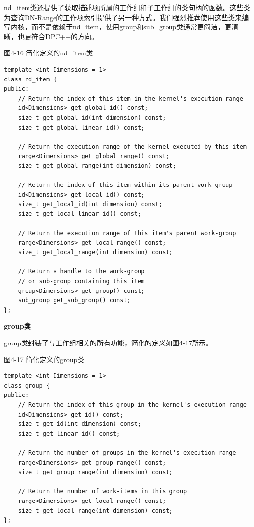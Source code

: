 nd\_item类还提供了获取描述项所属的工作组和子工作组的类句柄的函数。这些类为查询DN-Range的工作项索引提供了另一种方式。我们强烈推荐使用这些类来编写内核，而不是依赖于nd\_item，使用group和sub\_group类通常更简洁，更清晰，也更符合DPC++的方向。\par

\hspace*{\fill} \par %
图4-16 简化定义的nd\_item类
\begin{lstlisting}[caption={}]
template <int Dimensions = 1>
class nd_item {
public:
	// Return the index of this item in the kernel's execution range
	id<Dimensions> get_global_id() const;
	size_t get_global_id(int dimension) const;
	size_t get_global_linear_id() const;
	
	// Return the execution range of the kernel executed by this item
	range<Dimensions> get_global_range() const;
	size_t get_global_range(int dimension) const;
	
	// Return the index of this item within its parent work-group
	id<Dimensions> get_local_id() const;
	size_t get_local_id(int dimension) const;
	size_t get_local_linear_id() const;
	
	// Return the execution range of this item's parent work-group
	range<Dimensions> get_local_range() const;
	size_t get_local_range(int dimension) const;
	
	// Return a handle to the work-group
	// or sub-group containing this item
	group<Dimensions> get_group() const;
	sub_group get_sub_group() const;
};
\end{lstlisting}

\hspace*{\fill} \par %
\textbf{group类}

group类封装了与工作组相关的所有功能，简化的定义如图4-17所示。\par

\hspace*{\fill} \par %
图4-17 简化定义的group类
\begin{lstlisting}[caption={}]
template <int Dimensions = 1>
class group {
public:
	// Return the index of this group in the kernel's execution range
	id<Dimensions> get_id() const;
	size_t get_id(int dimension) const;
	size_t get_linear_id() const;
	
	// Return the number of groups in the kernel's execution range
	range<Dimensions> get_group_range() const;
	size_t get_group_range(int dimension) const;
	
	// Return the number of work-items in this group
	range<Dimensions> get_local_range() const;
	size_t get_local_range(int dimension) const;
};
\end{lstlisting}

